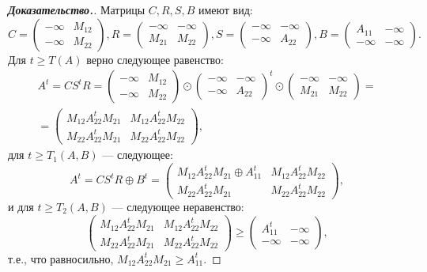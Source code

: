\documentclass[12pt]{article}
\begin{document}
\begin{proof}[\textbf{Доказательство.}]
Матрицы $C, R, S, B$ имеют вид:
\begin{equation*}
C = \begin{pmatrix}
-\infty & M_{12}\\
-\infty & M_{22}
\end{pmatrix}, 
R = \begin{pmatrix}
-\infty & -\infty \\
M_{21} & M_{22}
\end{pmatrix}, 
S = \begin{pmatrix}
-\infty & -\infty \\
-\infty & A_{22}
\end{pmatrix},
B = \begin{pmatrix}
A_{11} & -\infty \\
-\infty & -\infty
\end{pmatrix}.
\end{equation*}
Для $t \ge T(A)$ верно следующее равенство:
\begin{multline*}
A^t = CS^tR = \begin{pmatrix}
-\infty & M_{12}\\
-\infty & M_{22}
\end{pmatrix} \odot \begin{pmatrix}
-\infty & -\infty \\
-\infty & A_{22}
\end{pmatrix}^t \odot \begin{pmatrix}
-\infty & -\infty \\
M_{21} & M_{22}
\end{pmatrix} = \\
= \begin{pmatrix}
	M_{12}A_{22}^tM_{21} & M_{12}A_{22}^tM_{22} \\
	M_{22}A_{22}^tM_{21} & M_{22}A_{22}^tM_{22}
\end{pmatrix},
\end{multline*}
для $t \ge T_1(A, B)$ --- следующее:
\begin{equation*}
A^t = CS^tR \oplus B^t = \begin{pmatrix}
	M_{12}A_{22}^tM_{21} \oplus A_{11}^t & M_{12}A_{22}^tM_{22} \\
	M_{22}A_{22}^tM_{21} & M_{22}A_{22}^tM_{22}
\end{pmatrix},
\end{equation*}
и для $t \ge T_2(A, B)$ --- следующее неравенство:
\begin{equation*}
\begin{pmatrix}
	M_{12}A_{22}^tM_{21} & M_{12}A_{22}^tM_{22} \\
	M_{22}A_{22}^tM_{21} & M_{22}A_{22}^tM_{22}
\end{pmatrix} \ge \begin{pmatrix}
A_{11}^t & -\infty \\
-\infty & -\infty
\end{pmatrix},
\end{equation*} т.е., что равносильно, $M_{12}A_{22}^tM_{21} \ge A_{11}^t$.


\end{proof}
\end{document}
